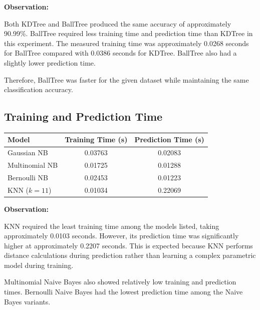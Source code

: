 \documentclass[12pt,a4paper]{article}
\begin{document}
\textbf{Observation:}

Both KDTree and BallTree produced the same accuracy of approximately 90.99\%. BallTree required less training time and prediction time than KDTree in this experiment. The measured training time was approximately 0.0268 seconds for BallTree compared with 0.0386 seconds for KDTree. BallTree also had a slightly lower prediction time.

Therefore, BallTree was faster for the given dataset while maintaining the same classification accuracy.


\subsection{Training and Prediction Time}

\begin{longtable}{|p{4cm}|c|c|}
\hline
\textbf{Model} &
\textbf{Training Time (s)} &
\textbf{Prediction Time (s)} \\ \hline

Gaussian NB &
0.03763 &
0.02083 \\ \hline

Multinomial NB &
0.01725 &
0.01288 \\ \hline

Bernoulli NB &
0.02453 &
0.01223 \\ \hline

KNN ($k=11$) &
0.01034 &
0.22069 \\ \hline

\end{longtable}

\textbf{Observation:}

KNN required the least training time among the models listed, taking approximately 0.0103 seconds. However, its prediction time was significantly higher at approximately 0.2207 seconds. This is expected because KNN performs distance calculations during prediction rather than learning a complex parametric model during training.

Multinomial Naive Bayes also showed relatively low training and prediction times. Bernoulli Naive Bayes had the lowest prediction time among the Naive Bayes variants.

\end{document}
